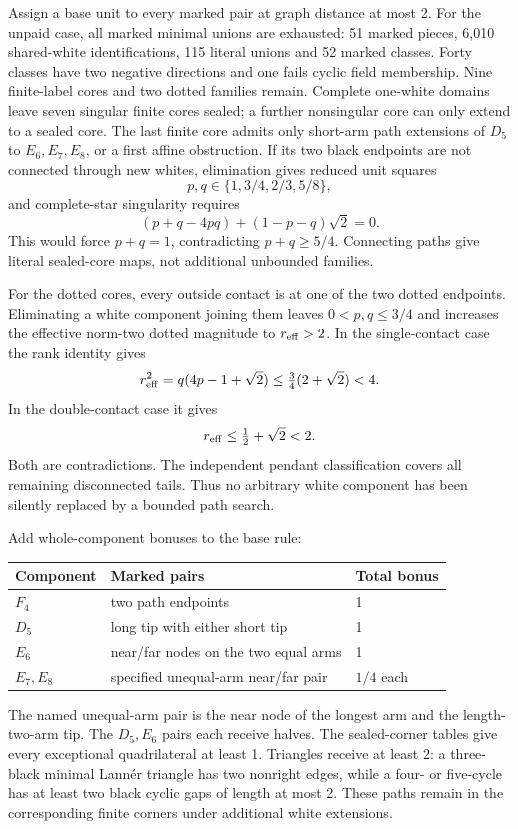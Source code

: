 \documentclass[11pt]{article}
\begin{document}
Assign a base unit to every marked pair at graph distance at most 2.
For the unpaid case, all marked minimal unions are exhausted: 51 marked
pieces, 6,010 shared-white identifications, 115 literal unions and 52
marked classes. Forty classes have two negative directions and one fails
cyclic field membership. Nine finite-label cores and two dotted families
remain. Complete one-white domains leave seven singular finite cores
sealed; a further nonsingular core can only extend to a sealed core.
The last finite core admits only short-arm path extensions of $D_5$ to
$E_6,E_7,E_8$, or a first affine obstruction. If its two black endpoints
are not connected through new whites, elimination gives reduced unit
squares
\[
 p,q\in\{1,3/4,2/3,5/8\},
\]
and complete-star singularity requires
\[
 (p+q-4pq)+(1-p-q)\sqrt 2=0.
\]
This would force $p+q=1$, contradicting $p+q\ge 5/4$.
Connecting paths give literal sealed-core maps, not additional unbounded
families.

For the dotted cores, every outside contact is at one of the two dotted
endpoints. Eliminating a white component joining them leaves
$0<p,q\le 3/4$ and increases the effective norm-two dotted magnitude to
$r_{\rm eff}>2$. In the single-contact case the rank identity gives
\[
 r_{\rm eff}^2=q(4p-1+\sqrt 2)
 \le\tfrac 34(2+\sqrt 2)<4.
\]
In the double-contact case it gives
\[
 r_{\rm eff}\le\tfrac 12+\sqrt 2<2.
\]
Both are contradictions. The independent pendant classification covers
all remaining disconnected tails. Thus no arbitrary white component has
been silently replaced by a bounded path search.

Add whole-component bonuses to the base rule:
\begin{center}
\begin{tabular}{lll}\toprule
Component&Marked pairs&Total bonus\\\midrule
$F_4$&two path endpoints&1\\
$D_5$&long tip with either short tip&1\\
$E_6$&near/far nodes on the two equal arms&1\\
$E_7,E_8$&specified unequal-arm near/far pair&$1/4$ each\\\bottomrule
\end{tabular}
\end{center}
The named unequal-arm pair is the near node of the longest arm and the
length-two-arm tip. The $D_5,E_6$ pairs each receive halves.
The sealed-corner tables give every exceptional quadrilateral at least 1.
Triangles receive at least 2: a three-black minimal Lann\'er triangle has
two nonright edges, while a four- or five-cycle has at least two black
cyclic gaps of length at most 2. These paths remain in the corresponding
finite corners under additional white extensions.
\end{document}
